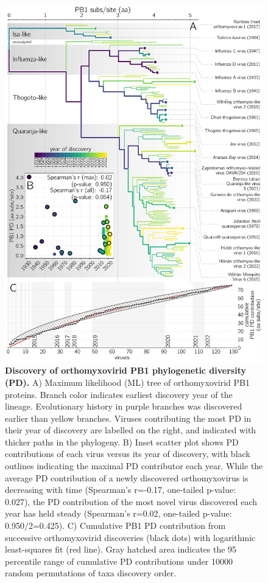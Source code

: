 \documentclass[11pt]{article}
\begin{document}
\begin{figure}%
\centering
\includegraphics[width=0.8\linewidth]{Fig3_contributions.pdf}
\caption{
\textbf{Discovery of orthomyxovirid PB1 phylogenetic diversity (PD).}
A) Maximum likelihood (ML) tree of orthomyxovirid PB1 proteins.
Branch color indicates earliest discovery year of the lineage.
Evolutionary history in purple branches was discovered earlier than yellow branches.
Viruses contributing the most PD in their year of discovery are labelled on the right, and indicated with thicker paths in the phylogeny.
B) Inset scatter plot shows PD contributions of each virus versus its year of discovery, with black outlines indicating the maximal PD contributor each year.
While the average PD contribution of a newly discovered orthomyxovirus is decreasing with time (Spearman's r=-0.17, one-tailed p-value: 0.027), the PD contribution of the most novel virus discovered each year has held steady (Spearman's r=0.02, one-tailed p-value: 0.950/2=0.425).
C) Cumulative PB1 PD contribution from successive orthomyxovirid discoveries (black dots) with logarithmic least-squares fit (red line).
Gray hatched area indicates the 95 percentile range of cumulative PD contributions under 10000 random permutations of taxa discovery order.
}
\label{fig:contributions}
\end{figure}
\end{document}
